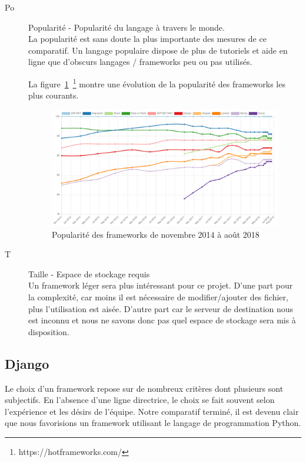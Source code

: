 \documentclass{EPL-master-thesis-covers-FR}
\begin{document}
\begin{description}
					\item[Po] Popularité - Popularité du langage à travers le monde. \hfill \\
							La popularité est sans doute la plus importante des mesures de ce comparatif. Un langage populaire dispose de plus de tutoriels et aide en ligne que d'obscurs langages / frameworks peu ou pas utilisés.

							La figure~\ref{fig:hotframework}~\footnote{https://hotframeworks.com/} montre une évolution de la popularité des frameworks les plus courants.

							\begin{figure}
								\centering
								\includegraphics[width=\textwidth]{images/hotframework.png}
								\caption{Popularité des frameworks de novembre 2014 à août 2018}
								\label{fig:hotframework}
							\end{figure}

					\item[T] Taille - Espace de stockage requis \hfill \\
							Un framework léger sera plus intéressant pour ce projet. D'une part pour la complexité, car moins il est nécessaire de modifier/ajouter des fichier, plus l'utilisation est aisée. D'autre part car le serveur de destination nous est inconnu et nous ne savons donc pas quel espace de stockage sera mis à disposition.
				\end{description}

				\subsection*{Django}
					Le choix d'un framework repose sur de nombreux critères dont plusieurs sont subjectifs. En l'absence d'une ligne directrice, le choix se fait souvent selon l'expérience et les désirs de l'équipe. Notre comparatif terminé, il est devenu clair que nous favorisions un framework utilisant le langage de programmation Python.
\end{document}
